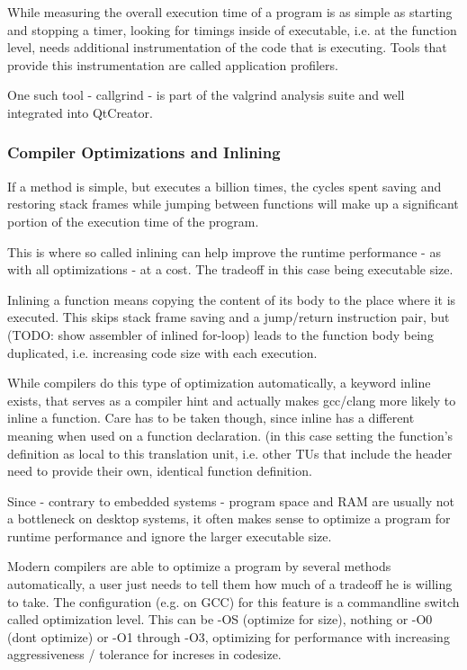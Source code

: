 While measuring the overall execution time of a program is as simple as starting and stopping a timer, looking for timings inside of executable, i.e. at the function level, needs additional instrumentation of the code that is executing. Tools that provide this instrumentation are called application profilers.


One such tool - callgrind - is part of the valgrind analysis suite and well integrated into QtCreator.

\subsubsection{Compiler Optimizations and Inlining}
If a method is simple, but executes a billion times, the cycles spent saving and restoring stack frames while jumping between functions will make up a significant portion of the execution time of the program.

This is where so called inlining can help improve the runtime performance - as with all optimizations - at a cost. The tradeoff in this case being executable size.

Inlining a function means copying the content of its body to the place where it is executed. This skips stack frame saving and a jump/return instruction pair, but (TODO: show assembler of inlined for-loop) leads to the function body being duplicated, i.e. increasing code size with each execution.

While compilers do this type of optimization automatically, a keyword inline exists, that serves as a compiler hint and actually makes gcc/clang more likely to inline a function. Care has to be taken though, since inline has a different meaning when used on a function declaration. (in this case setting the function's definition as local to this translation unit, i.e. other TUs that include the header need to provide their own, identical function definition.

Since - contrary to embedded systems - program space and RAM are usually not a bottleneck on desktop systems, it often makes sense to optimize a program for runtime performance and ignore the larger executable size.

Modern compilers are able to optimize a program by several methods automatically, a user just needs to tell them how much of a tradeoff he is willing to take. The configuration (e.g. on GCC) for this feature is a commandline switch called optimization level. This can be -OS (optimize for size), nothing or -O0 (dont optimize) or -O1 through -O3, optimizing for performance with increasing aggressiveness / tolerance for increses in codesize.


